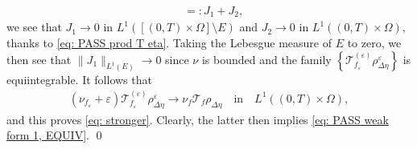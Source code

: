 \documentclass[10pt,a4paper]{amsart}
\newcommand{\calT}{\mathcal T}
\newcommand{\lt}{\left}
\renewenvironment{proof}[1][\proofname]{\noindent{\scshape #1.\quad}}{\qed}
\newcommand{\rt}{\right}
\newcommand{\ve}{\varepsilon}
\begin{document}
\begin{proof}
\begin{equation}
\begin{split}
    &=: J_1 + J_2,
\end{split}
\end{equation}
we see that $J_1\to 0$ in $L^1([(0,T)\times\Omega]\setminus E)$ and $J_2\to 0$ in $L^1((0,T)\times\Omega)$, thanks to \eqref{eq: PASS prod T eta}. Taking the Lebesgue measure of $E$ to zero, we then see that $\|J_1\|_{L^1(E)}\to 0$ since $\nu$ is bounded and the family $\lt\{\calT_{f_\ve}^{(\ve)} \rho_{\Delta\eta}^\ve\rt\}$ is equiintegrable. It follows that
\begin{align*}
    (\nu_{f_\ve} + \ve) \calT_{f_\ve}^{(\ve)} \rho_{\Delta\eta}^\ve \to \nu_f \calT_f \rho_{\Delta\eta} \quad \text{in}\quad L^1((0,T)\times \Omega),
\end{align*}
and this proves \eqref{eq: stronger}. Clearly, the latter then implies \eqref{eq: PASS weak form 1, EQUIV}.
\end{proof}
\end{document}
